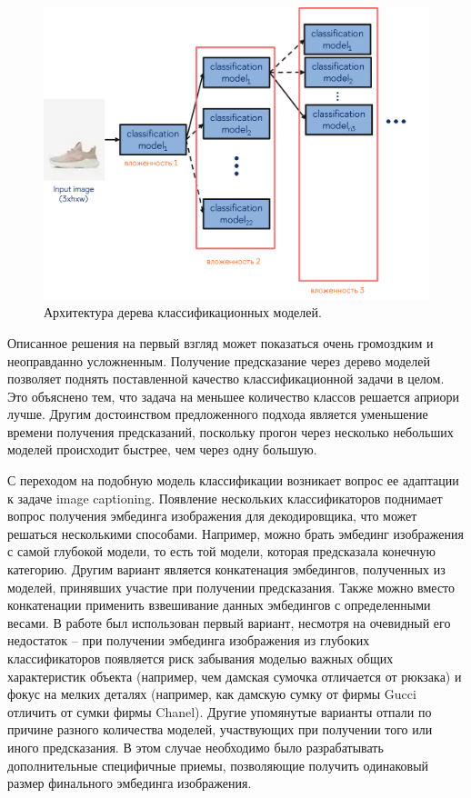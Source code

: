 \documentclass[a4paper,12pt]{extarticle}
\begin{document}
\begin{figure}[ht]
	\centering
	\includegraphics[scale=0.7]{classification/classification_treemodel.png}
	\caption{Архитектура дерева классификационных моделей.}
	\label{fig:classification_treemodel}
\end{figure}

Описанное решения на первый взгляд может показаться очень громоздким и неоправданно усложненным. Получение предсказание через дерево моделей позволяет поднять поставленной качество классификационной задачи в целом. Это объяснено тем, что задача на меньшее количество классов решается априори лучше. Другим достоинством предложенного подхода является уменьшение времени получения предсказаний, поскольку прогон через несколько небольших моделей происходит быстрее, чем через одну большую.

С переходом на подобную модель классификации возникает вопрос ее адаптации к задаче image captioning. Появление нескольких классификаторов поднимает вопрос получения эмбединга изображения для декодировщика, что может решаться несколькими способами. Например, можно брать эмбединг изображения с самой глубокой модели, то есть той модели, которая предсказала конечную категорию. Другим вариант является конкатенация эмбедингов, полученных из моделей, принявших участие при получении предсказания. Также можно вместо конкатенации применить взвешивание данных эмбедингов с определенными весами. В работе был использован первый вариант, несмотря на очевидный его недостаток – при получении эмбединга изображения из глубоких классификаторов появляется риск забывания моделью важных общих характеристик объекта (например, чем дамская сумочка отличается от рюкзака) и фокус на мелких деталях (например, как дамскую сумку от фирмы Gucci отличить от сумки фирмы Chanel). Другие упомянутые варианты отпали по причине разного количества моделей, участвующих при получении того или иного предсказания. В этом случае необходимо было разрабатывать дополнительные специфичные приемы, позволяющие получить одинаковый размер финального эмбединга изображения.
\end{document}
